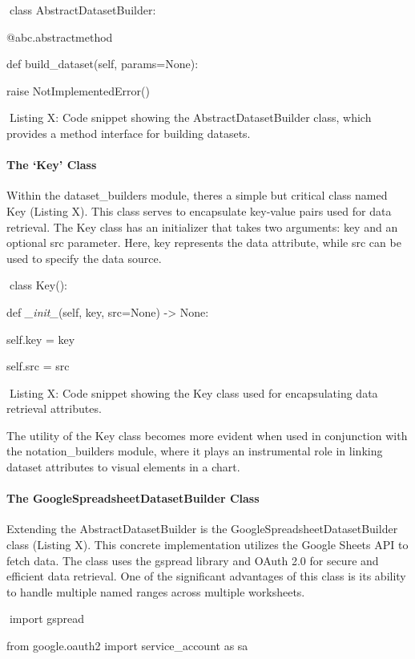 \documentclass[
]{article}
\begin{document}
class AbstractDatasetBuilder:

@abc.abstractmethod

def build\_dataset(self, params=None):

raise NotImplementedError()

Listing X: Code snippet showing the AbstractDatasetBuilder class, which
provides a method interface for building datasets.

\paragraph{The `Key' Class}\label{the-key-class}

Within the dataset\_builders module, there\textquotesingle s a simple
but critical class named Key (Listing X). This class serves to
encapsulate key-value pairs used for data retrieval. The Key class has
an initializer that takes two arguments: key and an optional src
parameter. Here, key represents the data attribute, while src can be
used to specify the data source.

class Key():

def \emph{\_init\_}(self, key, src=None) -\textgreater{} None:

self.key = key

self.src = src

Listing X: Code snippet showing the Key class used for encapsulating
data retrieval attributes.

The utility of the Key class becomes more evident when used in
conjunction with the notation\_builders module, where it plays an
instrumental role in linking dataset attributes to visual elements in a
chart.

\paragraph{The GoogleSpreadsheetDatasetBuilder
Class}\label{the-googlespreadsheetdatasetbuilder-class}

Extending the AbstractDatasetBuilder is the
GoogleSpreadsheetDatasetBuilder class (Listing X). This concrete
implementation utilizes the Google Sheets API to fetch data. The class
uses the gspread library and OAuth 2.0 for secure and efficient data
retrieval. One of the significant advantages of this class is its
ability to handle multiple named ranges across multiple worksheets.

import gspread

from google.oauth2 import service\_account as sa
\end{document}
